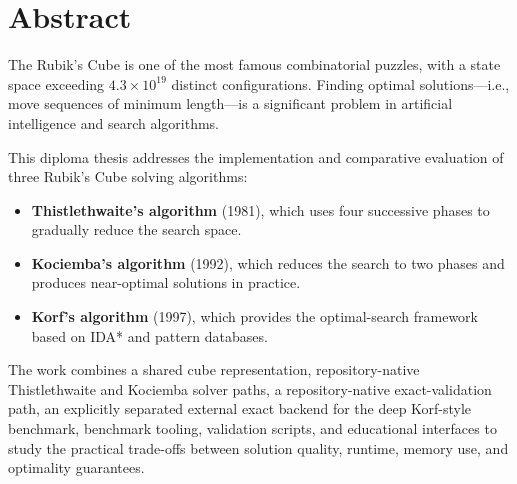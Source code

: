 
\chapter*{Abstract}

The Rubik's Cube is one of the most famous combinatorial puzzles, with a state space exceeding $4.3 \times 10^{19}$ distinct configurations. Finding optimal solutions---i.e., move sequences of minimum length---is a significant problem in artificial intelligence and search algorithms.

This diploma thesis addresses the implementation and comparative evaluation of three Rubik's Cube solving algorithms:
\begin{itemize}
    \item \textbf{Thistlethwaite's algorithm} (1981), which uses four successive phases to gradually reduce the search space.
    \item \textbf{Kociemba's algorithm} (1992), which reduces the search to two phases and produces near-optimal solutions in practice.
    \item \textbf{Korf's algorithm} (1997), which provides the optimal-search framework based on IDA* and pattern databases.
\end{itemize}

The work combines a shared cube representation, repository-native
Thistlethwaite and Kociemba solver paths, a repository-native exact-validation
path, an explicitly separated external exact backend for the deep Korf-style
benchmark, benchmark tooling, validation scripts, and educational interfaces to
study the practical trade-offs between solution quality, runtime, memory use,
and optimality guarantees.

